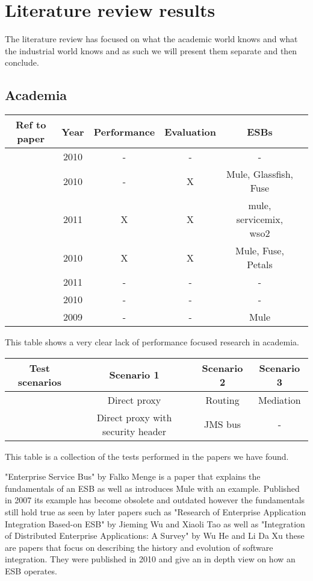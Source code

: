 ﻿\section{Literature review results}
\label{sec:litrev}

The literature review has focused on what the academic world knows and what the industrial world knows and as such we will present them separate and then conclude.

\subsection{Academia}

\begin{tabular}{| c | c | c | c | c | c |}
	\hline
	Ref to paper & Year & Performance & Evaluation & ESBs \\ 
	\hline	
	\cite{Nasr2010} & 2010 & - & - & - \\ 
	\hline
	\cite{Alghamdi2010} & 2010 & - & X & Mule, Glassfish, Fuse\\
	\hline
	\cite{Sanjay2011} & 2011 & X & X & mule, servicemix, wso2 \\ 
	\hline
	\cite{Garcia2010} & 2010 & X & X & Mule, Fuse, Petals \\
	\hline
	\cite{HeIntegration} & 2011 & - & - & -\\
	\hline
	\cite{Jieming2010} & 2010 & - & - & - \\
	\hline
	\cite{Brebner2009} & 2009 & - & - & Mule \\
	\hline
\end{tabular}
This table shows a very clear lack of performance focused research in academia.


\begin{tabular}{| c | c | c | c |}
	\hline
	Test scenarios & Scenario 1 & Scenario 2 & Scenario 3 \\
	\hline	
	\cite{Sanjay2011} & Direct proxy & Routing & Mediation \\ 
	\hline	
	\cite{Garcia2010} & Direct proxy with security header & JMS bus & - \\ 
	\hline	
\end{tabular}
This table is a collection of the tests performed in the papers we have found. 

"Enterprise Service Bus"\cite{falko07} by Falko Menge is a paper that explains the fundamentals of an ESB as well as introduces Mule with an example. Published in 2007 its example has become obsolete and outdated however the fundamentals still hold true as seen by later papers such as "Research of Enterprise Application Integration Based-on ESB" \cite{Jieming2010} by Jieming Wu and Xiaoli Tao as well as "Integration of Distributed Enterprise Applications: A Survey" \cite{HeIntegration} by Wu He and Li Da Xu these are papers that focus on describing the history and evolution of software integration. They were published in 2010 and give an in depth view on how an ESB  operates.


